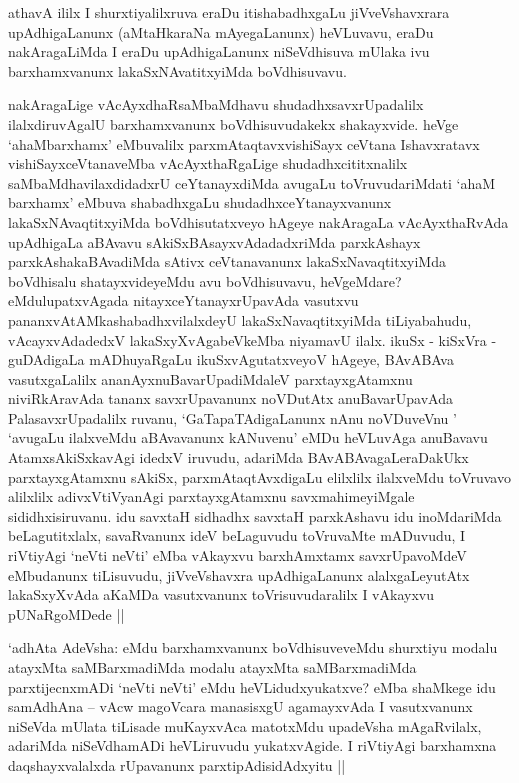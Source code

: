 \begin{artha}
athavA ililx I shurxtiyalilxruva eraDu itishabadhxgaLu jiVveVshavxrara
upAdhigaLanunx (aMtaHkaraNa mAyegaLanunx) heVLuvavu, eraDu
nakAragaLiMda I eraDu upAdhigaLanunx niSeVdhisuva mUlaka ivu
barxhamxvanunx lakaSxNAvatitxyiMda boVdhisuvavu.

nakAragaLige vAcAyxdhaRsaMbaMdhavu shudadhxsavxrUpadalilx
ilalxdiruvAgalU barxhamxvanunx boVdhisuvudakekx shakayxvide. heVge
`ahaMbarxhamx' eMbuvalilx parxmAtaqtavxvishiSayx ceVtana Ishavxratavx
vishiSayxceVtanaveMba vAcAyxthaRgaLige shudadhxcititxnalilx
saMbaMdhavilaxdidadxrU ceYtanayxdiMda avugaLu toVruvudariMdati `ahaM
barxhamx' eMbuva shabadhxgaLu shudadhxceYtanayxvanunx
lakaSxNAvaqtitxyiMda boVdhisutatxveyo hAgeye nakAragaLa vAcAyxthaRvAda
upAdhigaLa aBAvavu sAkiSxBAsayxvAdadadxriMda parxkAshayx
parxkAshakaBAvadiMda sAtivx ceVtanavanunx lakaSxNavaqtitxyiMda
boVdhisalu shatayxvideyeMdu avu boVdhisuvavu, heVgeMdare?
eMdulupatxvAgada nitayxceYtanayxrUpavAda vasutxvu
pananxvAtAMkashabadhxvilalxdeyU lakaSxNavaqtitxyiMda tiLiyabahudu,
vAcayxvAdadedxV lakaSxyXvAgabeVkeMba niyamavU ilalx. ikuSx - kiSxVra -
guDAdigaLa mADhuyaRgaLu ikuSxvAgutatxveyoV hAgeye, BAvABAva
vasutxgaLalilx ananAyxnuBavarUpadiMdaleV parxtayxgAtamxnu
niviRkAravAda tananx savxrUpavanunx noVDutAtx anuBavarUpavAda
PalasavxrUpadalilx ruvanu, `GaTapaTAdigaLanunx nAnu noVDuveVnu '
`avugaLu ilalxveMdu aBAvavanunx kANuvenu' eMDu heVLuvAga anuBavavu
AtamxsAkiSxkavAgi idedxV iruvudu, adariMda BAvABAvagaLeraDakUkx
parxtayxgAtamxnu sAkiSx, parxmAtaqtAvxdigaLu elilxlilx ilalxveMdu
toVruvavo alilxlilx adivxVtiVyanAgi parxtayxgAtamxnu savxmahimeyiMgale
sididhxisiruvanu. idu savxtaH sidhadhx savxtaH parxkAshavu idu
inoMdariMda beLagutitxlalx, savaRvanunx ideV beLaguvudu toVruvaMte
mADuvudu, I riVtiyAgi `neVti neVti' eMba vAkayxvu barxhAmxtamx
savxrUpavoMdeV eMbudanunx tiLisuvudu, jiVveVshavxra upAdhigaLanunx
alalxgaLeyutAtx lakaSxyXvAda aKaMDa vasutxvanunx toVrisuvudaralilx I
vAkayxvu pUNaRgoMDede ||

`adhAta AdeVsha: eMdu barxhamxvanunx boVdhisuveveMdu shurxtiyu modalu
atayxMta saMBarxmadiMda modalu atayxMta saMBarxmadiMda
parxtijecnxmADi `neVti neVti' eMdu heVLidudxyukatxve? eMba shaMkege
idu samAdhAna -- vAcw magoVcara manasisxgU agamayxvAda I vasutxvanunx
niSeVda mUlata tiLisade muKayxvAca matotxMdu upadeVsha mAgaRvilalx,
adariMda niSeVdhamADi heVLiruvudu yukatxvAgide. I riVtiyAgi barxhamxna
daqshayxvalalxda rUpavanunx parxtipAdisidAdxyitu ||
\end{artha}

